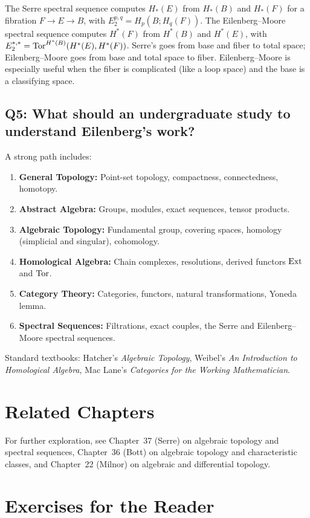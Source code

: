 The Serre spectral sequence computes $H_*(E)$ from $H_*(B)$ and $H_*(F)$ for a fibration $F \to E \to B$, with $E_2^{p,q} = H_p(B; H_q(F))$. The Eilenberg--Moore spectral sequence computes $H^*(F)$ from $H^*(B)$ and $H^*(E)$, with $E_2^{*,*} = \operatorname{Tor}^{H^*(B)}(H^*(E), H^*(F))$. Serre's goes from base and fiber to total space; Eilenberg--Moore goes from base and total space to fiber. Eilenberg--Moore is especially useful when the fiber is complicated (like a loop space) and the base is a classifying space.

\subsection*{Q5: What should an undergraduate study to understand Eilenberg's work?}

A strong path includes:
\begin{enumerate}
    \item \textbf{General Topology:} Point-set topology, compactness, connectedness, homotopy.
    \item \textbf{Abstract Algebra:} Groups, modules, exact sequences, tensor products.
    \item \textbf{Algebraic Topology:} Fundamental group, covering spaces, homology (simplicial and singular), cohomology.
    \item \textbf{Homological Algebra:} Chain complexes, resolutions, derived functors $\operatorname{Ext}$ and $\operatorname{Tor}$.
    \item \textbf{Category Theory:} Categories, functors, natural transformations, Yoneda lemma.
    \item \textbf{Spectral Sequences:} Filtrations, exact couples, the Serre and Eilenberg--Moore spectral sequences.
\end{enumerate}

Standard textbooks: Hatcher's \textit{Algebraic Topology}, Weibel's \textit{An Introduction to Homological Algebra}, Mac Lane's \textit{Categories for the Working Mathematician}.

\section{Related Chapters}
For further exploration, see Chapter~37 (Serre) on algebraic topology and spectral sequences, Chapter~36 (Bott) on algebraic topology and characteristic classes, and Chapter~22 (Milnor) on algebraic and differential topology.

\section*{Exercises for the Reader}

